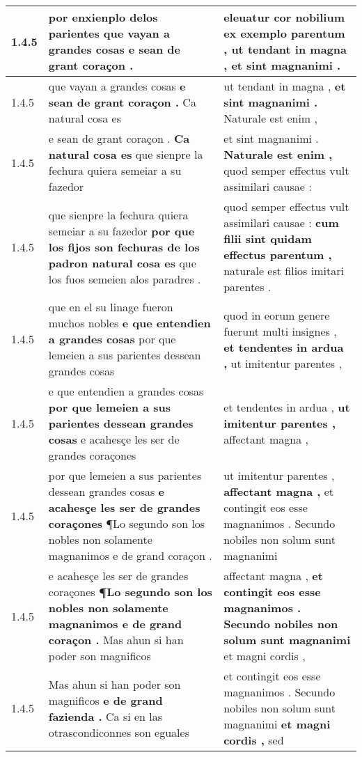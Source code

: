 \begin{tabular}{|p{1cm}|p{6.5cm}|p{6.5cm}|}
1.4.5 & por enxienplo delos parientes \textbf{ que vayan a grandes cosas } e sean de grant coraçon . & eleuatur cor nobilium ex exemplo parentum , \textbf{ ut tendant in magna , } et sint magnanimi . \\\hline
1.4.5 & que vayan a grandes cosas \textbf{ e sean de grant coraçon . } Ca natural cosa es & ut tendant in magna , \textbf{ et sint magnanimi . } Naturale est enim , \\\hline
1.4.5 & e sean de grant coraçon . \textbf{ Ca natural cosa es } que sienpre la fechura quiera semeiar a su fazedor & et sint magnanimi . \textbf{ Naturale est enim , } quod semper effectus vult assimilari causae : \\\hline
1.4.5 & que sienpre la fechura quiera semeiar a su fazedor \textbf{ por que los fijos son fechuras de los padron natural cosa es } que los fuos semeien alos paradres . & quod semper effectus vult assimilari causae : \textbf{ cum filii sint quidam effectus parentum , } naturale est filios imitari parentes . \\\hline
1.4.5 & que en el su linage fueron muchos nobles \textbf{ e que entendien a grandes cosas } por que lemeien a sus parientes dessean grandes cosas & quod in eorum genere fuerunt multi insignes , \textbf{ et tendentes in ardua , } ut imitentur parentes , \\\hline
1.4.5 & e que entendien a grandes cosas \textbf{ por que lemeien a sus parientes dessean grandes cosas } e acahesçe les ser de grandes coraçones & et tendentes in ardua , \textbf{ ut imitentur parentes , } affectant magna , \\\hline
1.4.5 & por que lemeien a sus parientes dessean grandes cosas \textbf{ e acahesçe les ser de grandes coraçones } ¶Lo segundo son los nobles non solamente magnanimos e de grand coraçon . & ut imitentur parentes , \textbf{ affectant magna , } et contingit eos esse magnanimos . Secundo nobiles non solum sunt magnanimi \\\hline
1.4.5 & e acahesçe les ser de grandes coraçones \textbf{ ¶Lo segundo son los nobles non solamente magnanimos e de grand coraçon . } Mas ahun si han poder son magnificos & affectant magna , \textbf{ et contingit eos esse magnanimos . Secundo nobiles non solum sunt magnanimi } et magni cordis , \\\hline
1.4.5 & Mas ahun si han poder son magnificos \textbf{ e de grand fazienda . } Ca si en las otrascondiconnes son eguales & et contingit eos esse magnanimos . Secundo nobiles non solum sunt magnanimi \textbf{ et magni cordis , } sed \\\hline

\end{tabular}
